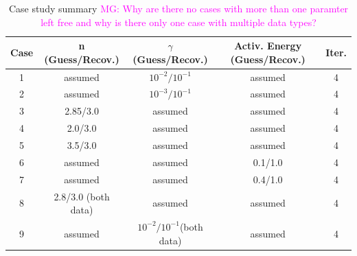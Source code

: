 \documentclass[12pt]{article}
\newcommand{\mgnote}[1]{\textcolor{magenta}{MG: #1}}
\begin{document}
	\begin{table}[H]
		\caption{Case study summary \mgnote{Why are there no cases with more than one paramter left free and why is there only one case with multiple data types?}} %
		\centering  %
		\begin{tabular}{c c c c c} %
		\hline \hline                        %
		Case&n (Guess/Recov.) &$\gamma$ (Guess/Recov.)   &Activ. Energy (Guess/Recov.) &Iter.   \\ [0.5ex] %
		\hline                  %
	        1 & assumed  & $10^{-2}/10^{-1}$ &   assumed & 4 \\
	        2 & assumed  & $10^{-3}/10^{-1}$ & assumed & 4 \\
	        3 & 2.85/3.0  & assumed  & assumed  & 4\\
	        4 & 2.0/3.0  & assumed & assumed  & 4\\
	        5 & 3.5/3.0  & assumed  & assumed  & 4\\
	        6 & assumed  & assumed & 0.1/1.0  & 4\\
	        7 & assumed  & assumed & 0.4/1.0  & 4\\
	        8 & 2.8/3.0 (both data)  & assumed & assumed  & 4\\
	        9 & assumed  & $10^{-2}/10^{-1}$(both data) & assumed  & 4\\
                 
                \hline %
		\end{tabular}
		\label{table:inversions} %
		\end{table}


\end{document}
